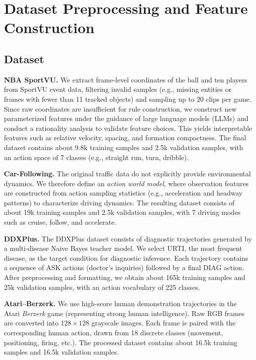 \documentclass{article} %
\begin{document}
\section{Dataset Preprocessing and Feature Construction}
\label{Sec:B}
\subsection{Dataset}
\label{Sec:B1}

\textbf{NBA SportVU.}
We extract frame-level coordinates of the ball and ten players from SportVU event data,
filtering invalid samples (e.g., missing entities or frames with fewer than 11 tracked objects)
and sampling up to 20 clips per game. Since raw coordinates are insufficient for rule
construction, we construct new parameterized features under the guidance of large language
models (LLMs) and conduct a rationality analysis to validate feature choices. This yields
interpretable features such as relative velocity, spacing, and formation compactness.
The final dataset contains about 9.8k training samples and 2.5k validation samples, with
an action space of 7 classes (e.g., straight run, turn, dribble).

\textbf{Car-Following.}
The original traffic data do not explicitly provide environmental dynamics.
We therefore define an \emph{action world model}, where observation features are constructed
from action sampling statistics (e.g., acceleration and headway patterns) to characterize
driving dynamics. The resulting dataset consists of about 19k training samples and 2.5k
validation samples, with 7 driving modes such as cruise, follow, and accelerate.

\textbf{DDXPlus.}
The DDXPlus dataset consists of diagnostic trajectories generated by a multi-disease
Naive Bayes teacher model. We select URTI, the most frequent disease, as the target
condition for diagnostic inference. Each trajectory contains a sequence of ASK actions
(doctor’s inquiries) followed by a final DIAG action. After preprocessing and formatting,
we obtain about 165k training samples and 25k validation samples, with an action
vocabulary of 225 classes.

\textbf{Atari--Berzerk.}
We use high-score human demonstration trajectories in the Atari \emph{Berzerk} game
(representing strong human intelligence). Raw RGB frames are converted into
$128\times128$ grayscale images. Each frame is paired with the corresponding
human action, drawn from 18 discrete classes (movement, positioning, firing, etc.).
The processed dataset contains about 16.5k training samples and 16.5k validation samples.
\end{document}
